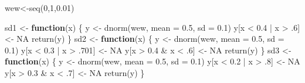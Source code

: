 \documentclass[
  letterpaper,
  DIV=11,
  numbers=noendperiod]{scrartcl}
\newenvironment{Shaded}{\begin{snugshade}}{\end{snugshade}}
\newcommand{\AttributeTok}[1]{\textcolor[rgb]{0.40,0.45,0.13}{#1}}
\newcommand{\ConstantTok}[1]{\textcolor[rgb]{0.56,0.35,0.01}{#1}}
\newcommand{\ControlFlowTok}[1]{\textcolor[rgb]{0.00,0.23,0.31}{\textbf{#1}}}
\newcommand{\DecValTok}[1]{\textcolor[rgb]{0.68,0.00,0.00}{#1}}
\newcommand{\FloatTok}[1]{\textcolor[rgb]{0.68,0.00,0.00}{#1}}
\newcommand{\FunctionTok}[1]{\textcolor[rgb]{0.28,0.35,0.67}{#1}}
\newcommand{\NormalTok}[1]{\textcolor[rgb]{0.00,0.23,0.31}{#1}}
\newcommand{\OtherTok}[1]{\textcolor[rgb]{0.00,0.23,0.31}{#1}}
\newcommand{\SpecialCharTok}[1]{\textcolor[rgb]{0.37,0.37,0.37}{#1}}
\begin{document}
\begin{Shaded}
\begin{Highlighting}[]
\NormalTok{wew}\OtherTok{\textless{}{-}}\FunctionTok{seq}\NormalTok{(}\DecValTok{0}\NormalTok{,}\DecValTok{1}\NormalTok{,}\FloatTok{0.01}\NormalTok{)}

\NormalTok{sd1 }\OtherTok{\textless{}{-}} \ControlFlowTok{function}\NormalTok{(x) \{}
\NormalTok{    y }\OtherTok{\textless{}{-}} \FunctionTok{dnorm}\NormalTok{(wew, }\AttributeTok{mean =} \FloatTok{0.5}\NormalTok{, }\AttributeTok{sd =} \FloatTok{0.1}\NormalTok{)}
\NormalTok{    y[x }\SpecialCharTok{\textless{}} \FloatTok{0.4} \SpecialCharTok{|}\NormalTok{ x }\SpecialCharTok{\textgreater{}}\NormalTok{ .}\DecValTok{6}\NormalTok{] }\OtherTok{\textless{}{-}} \ConstantTok{NA}
    \FunctionTok{return}\NormalTok{(y)}
\NormalTok{\}}
\NormalTok{sd2 }\OtherTok{\textless{}{-}} \ControlFlowTok{function}\NormalTok{(x) \{}
\NormalTok{    y }\OtherTok{\textless{}{-}} \FunctionTok{dnorm}\NormalTok{(wew, }\AttributeTok{mean =} \FloatTok{0.5}\NormalTok{, }\AttributeTok{sd =} \FloatTok{0.1}\NormalTok{)}
\NormalTok{    y[x }\SpecialCharTok{\textless{}} \FloatTok{0.3} \SpecialCharTok{|}\NormalTok{ x }\SpecialCharTok{\textgreater{}}\NormalTok{ .}\DecValTok{701}\NormalTok{] }\OtherTok{\textless{}{-}} \ConstantTok{NA}
\NormalTok{    y[x }\SpecialCharTok{\textgreater{}} \FloatTok{0.4} \SpecialCharTok{\&}\NormalTok{ x }\SpecialCharTok{\textless{}}\NormalTok{ .}\DecValTok{6}\NormalTok{] }\OtherTok{\textless{}{-}} \ConstantTok{NA}
    \FunctionTok{return}\NormalTok{(y)}
\NormalTok{\}}
\NormalTok{sd3 }\OtherTok{\textless{}{-}} \ControlFlowTok{function}\NormalTok{(x) \{}
\NormalTok{    y }\OtherTok{\textless{}{-}} \FunctionTok{dnorm}\NormalTok{(wew, }\AttributeTok{mean =} \FloatTok{0.5}\NormalTok{, }\AttributeTok{sd =} \FloatTok{0.1}\NormalTok{)}
\NormalTok{    y[x }\SpecialCharTok{\textless{}} \FloatTok{0.2} \SpecialCharTok{|}\NormalTok{ x }\SpecialCharTok{\textgreater{}}\NormalTok{ .}\DecValTok{8}\NormalTok{] }\OtherTok{\textless{}{-}} \ConstantTok{NA}
\NormalTok{    y[x }\SpecialCharTok{\textgreater{}} \FloatTok{0.3} \SpecialCharTok{\&}\NormalTok{ x }\SpecialCharTok{\textless{}}\NormalTok{ .}\DecValTok{7}\NormalTok{] }\OtherTok{\textless{}{-}} \ConstantTok{NA}
    \FunctionTok{return}\NormalTok{(y)}
\NormalTok{\}}


\end{Highlighting}
\end{Shaded}
\end{document}
